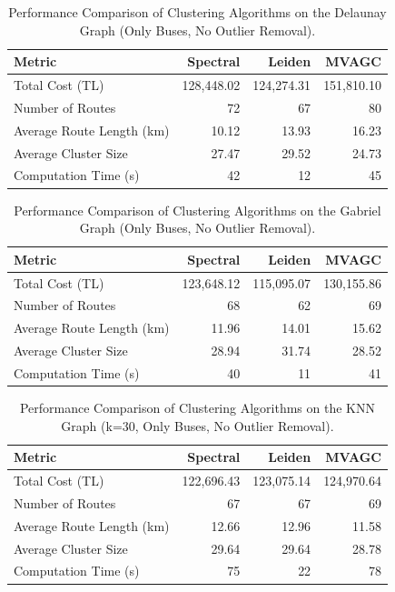 \begin{table}[h]
\centering
\label{tab:delaunay_results}
\begin{tabular}{lrrr}
\toprule
Metric & Spectral & Leiden & MVAGC \\
\midrule
Total Cost (TL) & 128,448.02 & 124,274.31 & 151,810.10 \\
Number of Routes & 72 & 67 & 80 \\
Average Route Length (km) & 10.12 & 13.93 & 16.23 \\
Average Cluster Size & 27.47 & 29.52 & 24.73 \\
Computation Time (s) & 42 & 12 & 45 \\
\bottomrule
\end{tabular}
\caption{Performance Comparison of Clustering Algorithms on the Delaunay Graph (Only Buses, No Outlier Removal).} %
\end{table}

\begin{table}[h]
\centering
\label{tab:gabriel_results}
\begin{tabular}{lrrr}
\toprule
Metric & Spectral & Leiden & MVAGC \\
\midrule
Total Cost (TL) & 123,648.12 & 115,095.07 & 130,155.86 \\
Number of Routes & 68 & 62 & 69 \\
Average Route Length (km) & 11.96 & 14.01 & 15.62 \\
Average Cluster Size & 28.94 & 31.74 & 28.52 \\
Computation Time (s) & 40 & 11 & 41 \\ 
\bottomrule
\end{tabular}
\caption{Performance Comparison of Clustering Algorithms on the Gabriel Graph (Only Buses, No Outlier Removal).} %
\end{table}

\begin{table}[h]
\centering
\label{tab:knn_results}
\begin{tabular}{lrrr}
\toprule
Metric & Spectral & Leiden & MVAGC \\
\midrule
Total Cost (TL) & 122,696.43 & 123,075.14 & 124,970.64 \\
Number of Routes & 67 & 67 & 69 \\
Average Route Length (km) & 12.66 & 12.96 & 11.58 \\
Average Cluster Size & 29.64 & 29.64 & 28.78 \\
Computation Time (s) & 75 & 22 & 78 \\ 
\bottomrule
\end{tabular}
\caption{Performance Comparison of Clustering Algorithms on the KNN Graph (k=30, Only Buses, No Outlier Removal).} %
\end{table}

